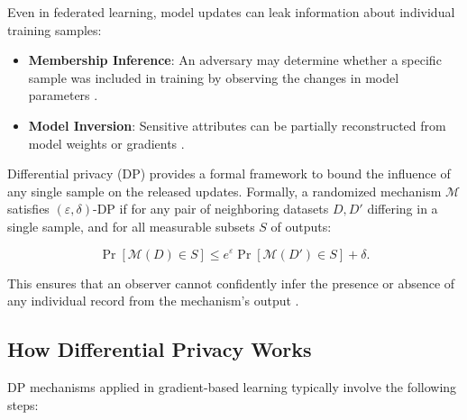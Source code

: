Even in federated learning, model updates can leak information about individual 
training samples:

\begin{itemize}
    \item \textbf{Membership Inference}: An adversary may determine whether a 
    specific sample was included in training by observing the changes in model 
    parameters \cite{shokri2017membership}.
    
    \item \textbf{Model Inversion}: Sensitive attributes can be partially 
    reconstructed from model weights or gradients \cite{fredrikson2015model}.
\end{itemize}

Differential privacy (DP) provides a formal framework to bound the influence of 
any single sample on the released updates. Formally, a randomized mechanism 
$\mathcal{M}$ satisfies $(\varepsilon, \delta)$-DP if for any pair of 
neighboring datasets $D, D'$ differing in a single sample, and for all measurable 
subsets $S$ of outputs:

\begin{equation}
    \Pr[\mathcal{M}(D) \in S] \leq e^\varepsilon \Pr[\mathcal{M}(D') \in S] + \delta.
\end{equation}

This ensures that an observer cannot confidently infer the presence or absence 
of any individual record from the mechanism’s output \cite{dwork2014algorithmic, 
abadi2016deep}.

\subsection{How Differential Privacy Works}
\label{subsec:dp_mechanism}

DP mechanisms applied in gradient-based learning typically involve the following 
steps:

